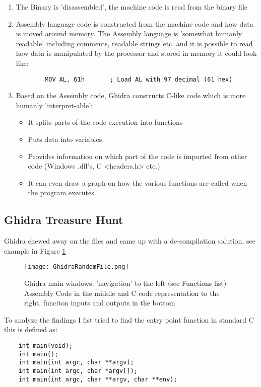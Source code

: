 \documentclass[
	letterpaper, %
	10pt, %
	unnumberedsections, %
	twoside, %
]{APAAssignment}
\begin{document}
\begin{enumerate}
	\item The Binary is 'disassembled', the machine code is read from the binary file
	\item Assembly language code is constructed from the machine code and how data is moved around memory. The Assembly language is 'somewhat humanly readable' including comments, readable strings etc. and it is possible to read how data is manipulated by the processor and stored in memory it could look like:  
	\begin{verbatim}
		MOV AL, 61h       ; Load AL with 97 decimal (61 hex)
	\end{verbatim} 
	
	\item Based on the Assembly code, Ghidra constructs C-like code which is more humanly 'interpret-able': \begin{itemize}
		\item It splits parts of the code execution into functions
		\item Puts data into variables.
		\item Provides information on which part of the code is imported from other code (Windows .dll's, C <headers.h> etc.)    
		\item It can even draw a graph on how the various functions are called when the program executes
	\end{itemize}
\end{enumerate}

\subsection{Ghidra Treasure Hunt}
Ghidra chewed away on the files and came up with a de-compilation solution, see example in Figure \ref{fig:Ghidra}

\begin{figure}[!htp] %
	\centering
	\texttt{[image: GhidraRandomFile.png]}
	\caption{Ghidra main windows, 'navigation' to the left (see Functions list) Assembly Code in the middle and C code representation to the right, funciton inputs and outputs in the bottom}
	\label{fig:Ghidra}
\end{figure}



To analyze the findings I fist tried to find the entry point function in standard C this is defined as:
\begin{verbatim}
	int main(void);
	int main();
	int main(int argc, char **argv);
	int main(int argc, char *argv[]);
	int main(int argc, char **argv, char **env);
\end{verbatim} 
\end{document}
